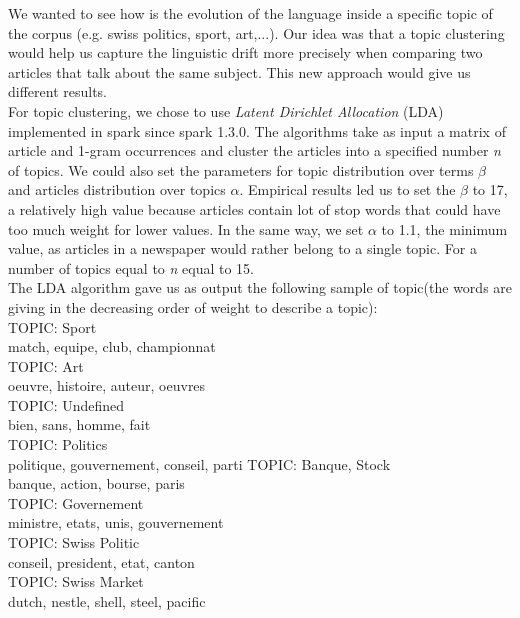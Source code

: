 We wanted to see how is the evolution of the language inside a specific topic of the corpus (e.g. swiss politics, sport, art,...).	
Our idea was that a topic clustering would help us capture the linguistic drift more precisely when comparing two articles that talk about the same subject.
This new approach would give us different results.\\
For topic clustering, we chose to use \emph{Latent Dirichlet Allocation} (LDA) implemented in spark since spark 1.3.0. 
The algorithms take as input a matrix of article and 1-gram occurrences and cluster the articles into a specified number \textit{n} of topics. We could also set the parameters for topic distribution over terms $\beta$ and articles distribution over topics $\alpha$. Empirical results led us to set the $\beta$ to 17, a relatively high value because articles contain lot of stop words that could have too much weight for lower values. In the same way, we set $\alpha$ to 1.1, the minimum value, as articles in a newspaper would rather belong to a single topic. For a number of topics equal to \textit{n} equal to 15.\\
The LDA algorithm gave us as output the following sample of topic(the words are giving in the decreasing order of weight to describe a topic):\\
TOPIC: Sport\\
match, equipe, club, championnat\\
TOPIC: Art\\
oeuvre, histoire, auteur, oeuvres\\
TOPIC: Undefined\\
bien, sans, homme, fait\\
TOPIC: Politics\\
politique, gouvernement, conseil, parti
TOPIC: Banque, Stock\\
banque, action, bourse, paris\\
TOPIC: Governement\\
ministre, etats, unis, gouvernement\\
TOPIC: Swiss Politic\\
conseil, president, etat, canton\\
TOPIC: Swiss Market\\
dutch, nestle, shell, steel, pacific\\

